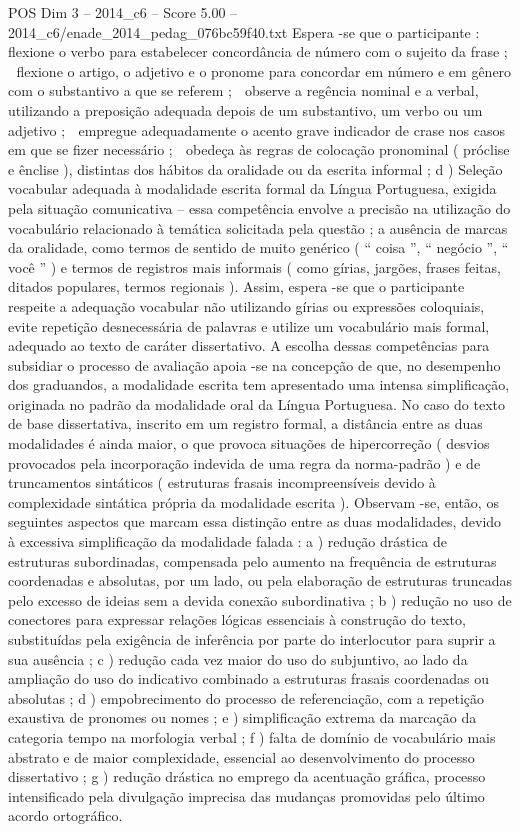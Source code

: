 \begin{textsample}{POS Dim 3 – 2014\_c6 – Score 5.00 – 2014\_c6/enade\_2014\_pedag\_076bc59f40.txt}
Espera -se que o participante :  flexione o verbo para estabelecer concordância de número com o sujeito da frase ;  flexione o artigo, o adjetivo e o pronome para concordar em número e em gênero com o substantivo a que se referem ;  observe a regência nominal e a verbal, utilizando a preposição adequada depois de um substantivo, um verbo ou um adjetivo ;  empregue adequadamente o acento grave indicador de crase nos casos em que se fizer necessário ;  obedeça às regras de colocação pronominal ( próclise e ênclise ), distintas dos hábitos da oralidade ou da escrita informal ; d ) Seleção vocabular adequada à modalidade escrita formal da Língua Portuguesa, exigida pela situação comunicativa – essa competência envolve a precisão na utilização do vocabulário relacionado à temática solicitada pela questão ; a ausência de marcas da oralidade, como termos de sentido de muito genérico ( “ coisa ”, “ negócio ”, “ você ” ) e termos de registros mais informais ( como gírias, jargões, frases feitas, ditados populares, termos regionais ).
Assim, espera -se que o participante respeite a adequação vocabular não utilizando gírias ou expressões coloquiais, evite repetição desnecessária de palavras e utilize um vocabulário mais formal, adequado ao texto de caráter dissertativo.
A escolha dessas competências para subsidiar o processo de avaliação apoia -se na concepção de que, no desempenho dos graduandos, a modalidade escrita tem apresentado uma intensa simplificação, originada no padrão da modalidade oral da Língua Portuguesa.
No caso do texto de base dissertativa, inscrito em um registro formal, a distância entre as duas modalidades é ainda maior, o que provoca situações de hipercorreção ( desvios provocados pela incorporação indevida de uma regra da norma-padrão ) e de truncamentos sintáticos ( estruturas frasais incompreensíveis devido à complexidade sintática própria da modalidade escrita ).
Observam -se, então, os seguintes aspectos que marcam essa distinção entre as duas modalidades, devido à excessiva simplificação da modalidade falada : a ) redução drástica de estruturas subordinadas, compensada pelo aumento na frequência de estruturas coordenadas e absolutas, por um lado, ou pela elaboração de estruturas truncadas pelo excesso de ideias sem a devida conexão subordinativa ; b ) redução no uso de conectores para expressar relações lógicas essenciais à construção do texto, substituídas pela exigência de inferência por parte do interlocutor para suprir a sua ausência ; c ) redução cada vez maior do uso do subjuntivo, ao lado da ampliação do uso do indicativo combinado a estruturas frasais coordenadas ou absolutas ; d ) empobrecimento do processo de referenciação, com a repetição exaustiva de pronomes ou nomes ; e ) simplificação extrema da marcação da categoria tempo na morfologia verbal ; f ) falta de domínio de vocabulário mais abstrato e de maior complexidade, essencial ao desenvolvimento do processo dissertativo ; g ) redução drástica no emprego da acentuação gráfica, processo intensificado pela divulgação imprecisa das mudanças promovidas pelo último acordo ortográfico.

\end{textsample}

